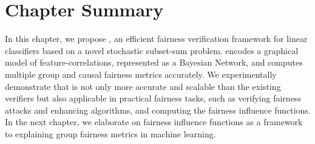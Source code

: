 \section{Chapter Summary}
In this chapter, we propose {\fvgm}, an efficient fairness verification framework for linear classifiers based on a novel stochastic subset-sum problem. {\fvgm} encodes a graphical model of feature-correlations, represented as a Bayesian Network, and computes multiple group and causal fairness metrics accurately. We experimentally demonstrate that {\fvgm} is not only more accurate and scalable than the existing verifiers but also applicable in practical fairness tasks, such as verifying fairness attacks and enhancing algorithms, and computing the fairness influence functions. In the next chapter, we elaborate on fairness influence functions as a framework to explaining group fairness metrics in machine learning.
\begin{comment}
\end{comment}

